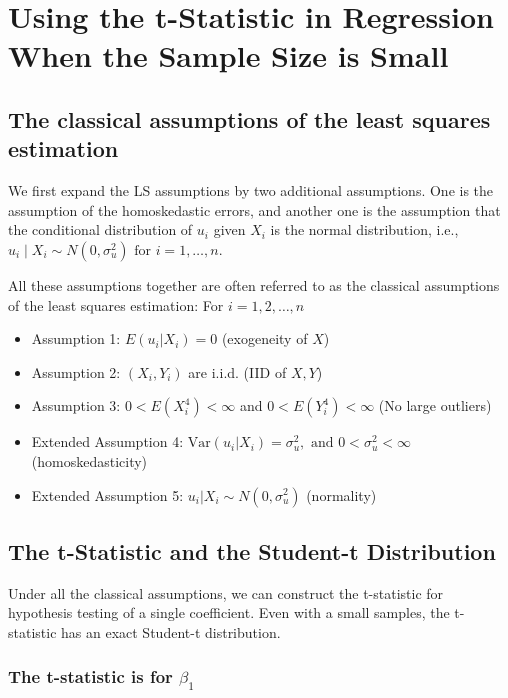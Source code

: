 \documentclass[a4paper,11pt]{article}
\newcommand{\var}{\mathrm{Var}}
\begin{document}
\section{Using the t-Statistic in Regression When the Sample Size is Small}
\label{sec:org655c70b}

\subsection{The classical assumptions of the least squares estimation}
\label{sec:org6fc8038}

We first expand the LS assumptions by two additional assumptions. One
is the assumption of the homoskedastic errors, and another one is the
assumption that the conditional distribution of \(u_i\) given \(X_i\) is
the normal distribution, i.e., \(u_i \mid X_i \sim N(0, \sigma^2_u) \text{ for }
i = 1, \ldots, n\).

All these assumptions together are often referred to as the classical
assumptions of the least squares estimation:
For \(i = 1, 2, \ldots, n\)
\begin{itemize}
\item Assumption 1: \(E(u_i | X_i) = 0\) (exogeneity of \(X\))
\item Assumption 2: \((X_i, Y_i)\) are i.i.d. (IID of \(X, Y\))
\item Assumption 3: \(0 < E(X_i^4) < \infty\) and \(0 < E(Y_i^4) < \infty\)
(No large outliers)
\item Extended Assumption 4: \(\var(u_i | X_i) = \sigma^2_u, \text{ and } 0 <
                   \sigma^2_u < \infty\) (homoskedasticity)
\item Extended Assumption 5: \(u_i | X_i \sim N(0, \sigma^2_u)\) (normality)
\end{itemize}


\subsection{The t-Statistic and the Student-t Distribution}
\label{sec:orgf308348}

Under all the classical assumptions, we can construct the
t-statistic for hypothesis testing of a single coefficient. Even with
a small samples, the t-statistic has an exact Student-t distribution. 

\subsubsection*{The t-statistic is for \(\beta_1\)}
\label{sec:org9ca9fd4}
\end{document}
